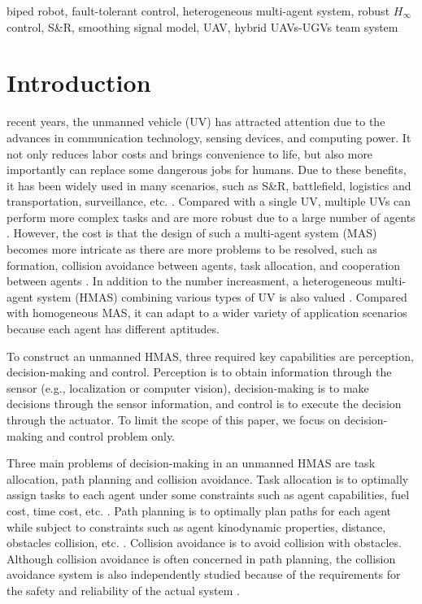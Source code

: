 \documentclass{ieeeaccess}
\begin{document}
\begin{keywords}
biped robot, fault-tolerant control, heterogeneous multi-agent system, robust $H_\infty$ control, S\&R, smoothing signal model, UAV, hybrid UAVs-UGVs team system
\end{keywords}

\titlepgskip=-15pt

\maketitle

\section{Introduction}
 recent years, the unmanned vehicle (UV) has attracted attention due to the advances in communication technology, sensing devices, and computing power. It not only reduces labor costs and brings convenience to life, but also more importantly can replace some dangerous jobs for humans. Due to these benefits, it has been widely used in many scenarios, such as S\&R, battlefield, logistics and transportation, surveillance, etc. \cite{9700861}. Compared with a single UV, multiple UVs can perform more complex tasks and are more robust due to a large number of agents \cite{8352646}. However, the cost is that the design of such a multi-agent system (MAS) becomes more intricate as there are more problems to be resolved, such as formation, collision avoidance between agents, task allocation, and cooperation between agents \cite{chen2019control}. In addition to the number increasment, a heterogeneous multi-agent system (HMAS) combining various types of UV is also valued \cite{9371292}. Compared with homogeneous MAS, it can adapt to a wider variety of application scenarios because each agent has different aptitudes.

To construct an unmanned HMAS, three required key capabilities are perception, decision-making and control. Perception is to obtain information through the sensor (e.g., localization or computer vision), decision-making is to make decisions through the sensor information, and control is to execute the decision through the actuator. To limit the scope of this paper, we focus on decision-making and control problem only.

Three main problems of decision-making in an unmanned HMAS are task allocation, path planning and collision avoidance. Task allocation is to optimally assign tasks to each agent under some constraints such as agent capabilities, fuel cost, time cost, etc. \cite{skaltsis2021survey}. Path planning is to optimally plan paths for each agent while subject to constraints such as agent kinodynamic properties, distance, obstacles collision, etc. \cite{zhang2018path}. Collision avoidance is to avoid collision with obstacles. Although collision avoidance is often concerned in path planning, the collision avoidance system is also independently studied because of the requirements for the safety and reliability of the actual system \cite{9108245}.
\end{document}
